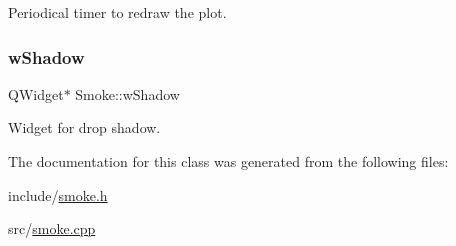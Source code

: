 Periodical timer to redraw the plot. 

\mbox{\label{classSmoke_aa6b959618b43da0106cc49148be321e8}} 
\subsubsection{\texorpdfstring{wShadow}{wShadow}}
{\footnotesize\ttfamily Q\+Widget$\ast$ Smoke\+::w\+Shadow\hspace{0.3cm}{\ttfamily [private]}}



Widget for drop shadow. 



The documentation for this class was generated from the following files\+:\begin{DoxyCompactItemize}
\item 
include/\mbox{\hyperlink{smoke_8h}{smoke.\+h}}\item 
src/\mbox{\hyperlink{smoke_8cpp}{smoke.\+cpp}}\end{DoxyCompactItemize}
